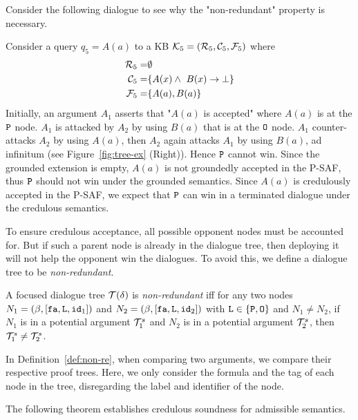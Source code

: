 Consider the following dialogue to see why the "non-redundant" property is necessary.

\begin{example}
\label{ex:infinite-credulous}
Consider a query $q_5 = A(a)$ to a KB $\mathcal{K}_5 = (\mathcal{R}_5, \mathcal{C}_5, \mathcal{F}_5)$ where
\begin{align*}
    \mathcal{R}_5 = &\emptyset \\
    \mathcal{C}_5 = & \{ A(x) \land \ B(x) \rightarrow \bot \} \\
    \mathcal{F}_5 = & \{A(a), B(a) \}
\end{align*}
Initially, an argument $A_1$ asserts that "$A(a)$ is accepted" where $A(a)$ is at the $\texttt{\textup{P}}$ node. $A_1$ is attacked by $A_2$ by using $B(a)$ that is at the $\texttt{\textup{O}}$ node. $A_1$ counter-attacks $A_2$ by using $A(a)$, then $A_2$ again attacks $A_1$ by using $B(a)$, ad infinitum (see Figure~\ref{fig:tree-ex} (Right)). Hence $\texttt{\textup{P}}$ cannot win.
%
%
Since the grounded extension is empty, $A(a)$ is not groundedly accepted in the P-SAF, thus $\texttt{\textup{P}}$ should not win under the grounded semantics. Since $A(a)$ is credulously accepted in the P-SAF, we expect that $\texttt{\textup{P}}$ can win in a terminated dialogue under the credulous semantics.
\end{example}





To ensure credulous acceptance, all possible opponent nodes must be accounted for. But if such a parent node is already in the dialogue tree, then deploying it will not help the opponent win the dialogues. To avoid this, we define a dialogue tree to be \emph{non-redundant}. 


\begin{definition}
\label{def:non-re}
     A focused dialogue tree $\mathcal{T}(\delta)$ is \emph{non-redundant} iff for any two nodes $N_1 = (\beta, [\texttt{\textup{fa}}, \texttt{\textup{L}}, \texttt{\textup{id}}_1])$  and $N_2 = (\beta, [\texttt{\textup{fa}}, \texttt{\textup{L}}, \texttt{\textup{id}}_2])$ with $\texttt{\textup{L}} \in \{\texttt{\textup{P}}, \texttt{\textup{O}}\}$ and $N_1 \neq N_2$, if $N_1$ is in a potential argument $\mathcal{T}_1^{s}$ and $N_2$ is in a potential argument $\mathcal{T}_2^{s}$, then $\mathcal{T}_1^{s} \neq \mathcal{T}_2^{s}$.
\end{definition}


In Definition~\ref{def:non-re}, when comparing two arguments, we compare their respective proof trees. Here, we only consider the formula and the tag of each node in the tree, disregarding the label and identifier of the node.


The following theorem establishes credulous soundness for admissible semantics.

